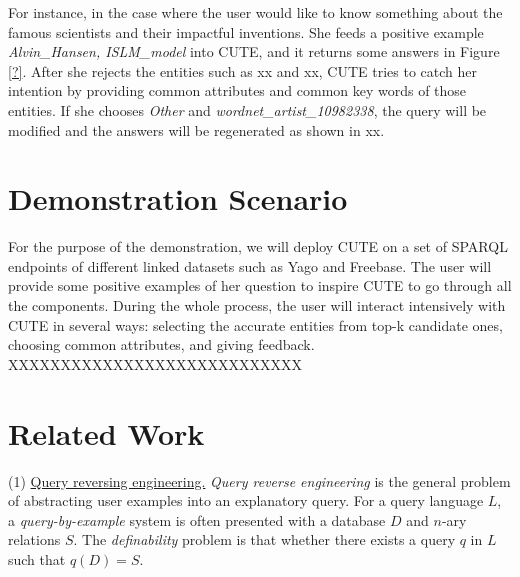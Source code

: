 \documentclass[10pt,conference,letterpaper]{IEEEtran}
\begin{document}
For instance, in the case where the user would like to know something about the famous scientists and their impactful inventions. She feeds a positive example \emph{Alvin\_Hansen, IS\–LM\_model} into CUTE, and it returns some answers in Figure \ref{?}. After she rejects the entities such as xx and xx, CUTE tries to catch her intention by providing common attributes and common key words of those entities. If she chooses \emph{Other} and \emph{wordnet\_artist\_10982338}, the query will be modified and the answers will be regenerated as shown in xx.

\section{Demonstration Scenario}

For the purpose of the demonstration, we will deploy CUTE on a set of SPARQL endpoints of different linked datasets such as Yago and Freebase. The user will provide some positive examples of her question to inspire CUTE to go through all the components.
During the whole process, the user will interact intensively with CUTE in several ways: selecting the accurate entities from top-k candidate ones, choosing common attributes, and giving feedback. XXXXXXXXXXXXXXXXXXXXXXXXXXXX


\section{Related Work}
(1) \underline{Query reversing engineering.}
\emph{Query reverse engineering} is the general problem of abstracting user examples into an explanatory query. For a query language $L$, a \emph{query-by-example} system is often presented with a database $D$ and $n$-ary relations $S$. The \emph{definability} problem is that whether there exists a query $q$ in $L$ such that $q(D)=S$. 
\end{document}
